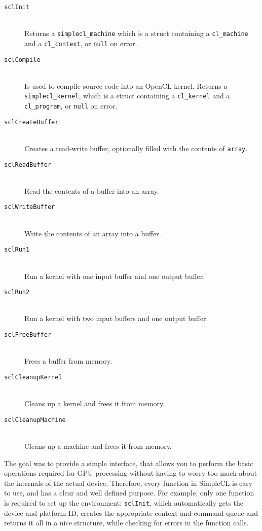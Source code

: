 \begin{description}
  \item[\texttt{sclInit}] \hfill \\
    Returns a \texttt{simplecl\_machine}
    which is a struct containing a \texttt{cl\_machine} and a
    \texttt{cl\_context}, or \texttt{null} on error.
  \item[\texttt{sclCompile}] \hfill \\ Is used to compile source code into
    an OpenCL kernel. Returns a \texttt{simplecl\_kernel}, which is a
    struct containing a \texttt{cl\_kernel} and a
    \texttt{cl\_program}, or \texttt{null} on error.
  \item[\texttt{sclCreateBuffer}] \hfill \\ Creates a read-write buffer,
    optionally filled with the contents of \texttt{array}.
  \item[\texttt{sclReadBuffer}] \hfill \\ Read the contents of a buffer into an
    array.
  \item[\texttt{sclWriteBuffer}] \hfill \\ Write the contents of an array into a
    buffer.
  \item[\texttt{sclRun1}] \hfill \\ Run a kernel with one input buffer and one
    output buffer.
  \item[\texttt{sclRun2}] \hfill \\ Run a kernel with two input buffers and one
    output buffer.
  \item[\texttt{sclFreeBuffer}] \hfill \\ Frees a buffer from memory.
  \item[\texttt{sclCleanupKernel}] \hfill \\ Cleans up a kernel and frees it
    from memory.
  \item[\texttt{sclCleanupMachine}] \hfill \\ Cleans up a machine and frees it
    from memory.
\end{description}

The goal was to provide a simple interface, that allows you to perform
the basic operations required for GPU processing without having to
worry too much about the internals of the actual device. Therefore,
every function in SimpleCL is easy to use, and has a clear and well
defined purpose. For example, only one function is required to set up
the environment: \texttt{sclInit}, which automatically gets the device
and platform ID, creates the appropriate context and command queue and
returns it all in a nice structure, while checking for errors in the
function calls.

